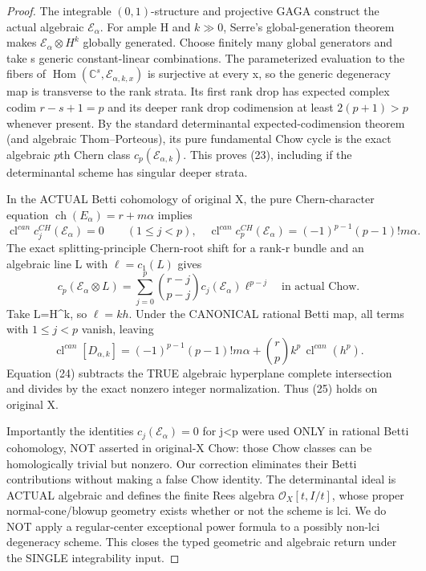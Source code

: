 \documentclass[11pt]{article}
\begin{document}
\begin{proof}
The integrable $(0,1)$-structure
and projective GAGA construct
the actual algebraic
$\mathcal E_\alpha$.
For ample H and $k\gg0$,
Serre's global-generation theorem
makes $\mathcal E_\alpha\otimes H^k$
globally generated. Choose finitely
many global generators and take
s generic constant-linear
combinations. The parameterized
evaluation to the fibers of
$\operatorname{Hom}(\mathbb C^s,
\mathcal E_{\alpha,k,x})$ is
surjective at every x, so
the generic degeneracy map
is transverse to the rank
strata. Its first rank drop
has expected complex codim
$r-s+1=p$ and its deeper
rank drop codimension at least
$2(p+1)>p$ whenever present.
By the standard determinantal
expected-codimension theorem
(and algebraic Thom--Porteous),
its pure fundamental Chow
cycle is the exact
algebraic $p$th Chern class
$c_p(\mathcal E_{\alpha,k})$.
This proves (23), including
if the determinantal scheme
has singular deeper strata.

In the ACTUAL Betti cohomology
of original X, the pure
Chern-character equation
$\operatorname{ch}(E_\alpha)
=r+m\alpha$ implies
\[
 \operatorname{cl}^{can}
   c_j^{CH}(\mathcal E_\alpha)=0
               \qquad(1\le j<p),
\quad
 \operatorname{cl}^{can}
   c_p^{CH}(\mathcal E_\alpha)
 =(-1)^{p-1}(p-1)!m\alpha .
\]
The exact splitting-principle
Chern-root shift for a rank-r
bundle and an algebraic line L
with $\ell=c_1(L)$ gives
\[
 \boxed{
 c_p(\mathcal E_\alpha\otimes L)
 =\sum_{j=0}^{p}
    \binom{r-j}{p-j}
         c_j(\mathcal E_\alpha)
         \ell^{p-j}
       \quad\text{in actual Chow}.
 }                                                    \tag{26}
\]
Take L=H^k, so $\ell=k h$.
Under the CANONICAL rational
Betti map, all terms with
$1\le j<p$ vanish, leaving
\[
 \operatorname{cl}^{can}
   [D_{\alpha,k}]
 =(-1)^{p-1}(p-1)!m\alpha
    +\binom rp k^p\,
       \operatorname{cl}^{can}(h^p).
\]
Equation (24) subtracts the
TRUE algebraic hyperplane
complete intersection and
divides by the exact nonzero
integer normalization.
Thus (25) holds on original X.

Importantly the identities
$c_j(\mathcal E_\alpha)=0$
for j<p were used ONLY in
rational Betti cohomology,
NOT asserted in original-X
Chow: those Chow classes
can be homologically trivial
but nonzero. Our correction
eliminates their Betti
contributions without making
a false Chow identity.
The determinantal ideal is
ACTUAL algebraic and defines
the finite Rees algebra
$\mathcal O_X[t,I/t]$, whose
proper normal-cone/blowup
geometry exists whether
or not the scheme is lci.
We do NOT apply a
regular-center exceptional
power formula to a possibly
non-lci degeneracy scheme.
This closes the typed
geometric and algebraic
return under the SINGLE
integrability input.
\end{proof}
\end{document}
